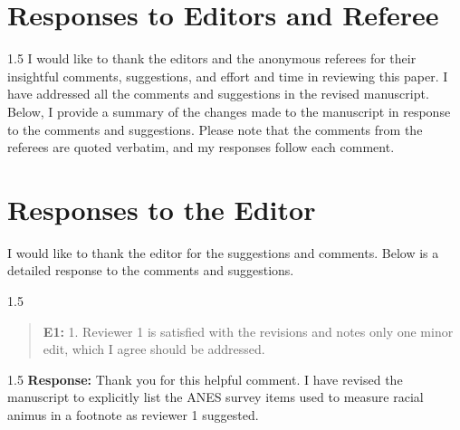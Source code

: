 \documentclass[12pt,english]{article}
\newcommand{\rrxspc}{1.5}
\begin{document}
\begin{refsection}
\setcounter{section}{0}
\renewcommand{\thesection}{\Alph{section}}
\renewcommand{\thesubsection}{\Alph{section}.\arabic{subsection}}
\renewcommand{\thesubsubsection}{\Alph{section}.\arabic{subsection}.\arabic{subsubsection}}

        \section{Responses to Editors and Referee} \label{rr:responses}
        \begin{spacing}{\rrxspc}
            I would like to thank the editors and the anonymous referees for their insightful comments, suggestions, and effort and time in reviewing this paper. I have addressed all the comments and suggestions in the revised manuscript. Below, I provide a summary of the changes made to the manuscript in response to the comments and suggestions. Please note that the comments from the referees are quoted verbatim, and my responses follow each comment.
        \end{spacing}

    \newpage
    
    \section{Responses to the Editor}
        I would like to thank the editor for the suggestions and comments. Below is a detailed response to the comments and suggestions.
        \begin{spacing}{\rrxspc}
            \begin{quotation}
                \textbf{E1: } 1. Reviewer 1 is satisfied with the revisions and notes only one minor edit, which I agree should be addressed.
            \end{quotation}
        \end{spacing}
        \begin{spacing}{\rrxspc}
        \textbf{Response:} Thank you for this helpful comment. I have revised the manuscript to explicitly list the ANES survey items used to measure racial animus in a footnote as reviewer 1 suggested.
    \end{spacing}


\end{refsection}
\end{document}

